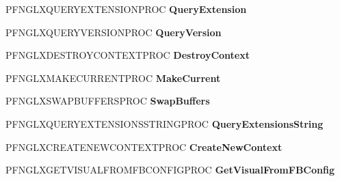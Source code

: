 \begin{DoxyCompactItemize}
\item 
\hypertarget{struct__GLFWlibraryGLX_a85b0d38829089464bb527e1160ea3d84}{}P\+F\+N\+G\+L\+X\+Q\+U\+E\+R\+Y\+E\+X\+T\+E\+N\+S\+I\+O\+N\+P\+R\+O\+C {\bfseries Query\+Extension}\label{struct__GLFWlibraryGLX_a85b0d38829089464bb527e1160ea3d84}

\item 
\hypertarget{struct__GLFWlibraryGLX_a7f19c51eb8a2b76be2b85d5ac6821d07}{}P\+F\+N\+G\+L\+X\+Q\+U\+E\+R\+Y\+V\+E\+R\+S\+I\+O\+N\+P\+R\+O\+C {\bfseries Query\+Version}\label{struct__GLFWlibraryGLX_a7f19c51eb8a2b76be2b85d5ac6821d07}

\item 
\hypertarget{struct__GLFWlibraryGLX_a84bc979545f50da00df2ca6c8c279c48}{}P\+F\+N\+G\+L\+X\+D\+E\+S\+T\+R\+O\+Y\+C\+O\+N\+T\+E\+X\+T\+P\+R\+O\+C {\bfseries Destroy\+Context}\label{struct__GLFWlibraryGLX_a84bc979545f50da00df2ca6c8c279c48}

\item 
\hypertarget{struct__GLFWlibraryGLX_a99f3ec71060b66bf6e7324697c15e32d}{}P\+F\+N\+G\+L\+X\+M\+A\+K\+E\+C\+U\+R\+R\+E\+N\+T\+P\+R\+O\+C {\bfseries Make\+Current}\label{struct__GLFWlibraryGLX_a99f3ec71060b66bf6e7324697c15e32d}

\item 
\hypertarget{struct__GLFWlibraryGLX_afd71b5d28763e2d279ad55bcd016ab87}{}P\+F\+N\+G\+L\+X\+S\+W\+A\+P\+B\+U\+F\+F\+E\+R\+S\+P\+R\+O\+C {\bfseries Swap\+Buffers}\label{struct__GLFWlibraryGLX_afd71b5d28763e2d279ad55bcd016ab87}

\item 
\hypertarget{struct__GLFWlibraryGLX_a0dd7cdefdb45bdd9e9b2334a2b4dce49}{}P\+F\+N\+G\+L\+X\+Q\+U\+E\+R\+Y\+E\+X\+T\+E\+N\+S\+I\+O\+N\+S\+S\+T\+R\+I\+N\+G\+P\+R\+O\+C {\bfseries Query\+Extensions\+String}\label{struct__GLFWlibraryGLX_a0dd7cdefdb45bdd9e9b2334a2b4dce49}

\item 
\hypertarget{struct__GLFWlibraryGLX_ad449f10460f7eb0b147d7982e0ef84ee}{}P\+F\+N\+G\+L\+X\+C\+R\+E\+A\+T\+E\+N\+E\+W\+C\+O\+N\+T\+E\+X\+T\+P\+R\+O\+C {\bfseries Create\+New\+Context}\label{struct__GLFWlibraryGLX_ad449f10460f7eb0b147d7982e0ef84ee}

\item 
\hypertarget{struct__GLFWlibraryGLX_a35d9a65ae03199683acfd16a8a8f2ab8}{}P\+F\+N\+G\+L\+X\+G\+E\+T\+V\+I\+S\+U\+A\+L\+F\+R\+O\+M\+F\+B\+C\+O\+N\+F\+I\+G\+P\+R\+O\+C {\bfseries Get\+Visual\+From\+F\+B\+Config}\label{struct__GLFWlibraryGLX_a35d9a65ae03199683acfd16a8a8f2ab8}


\end{DoxyCompactItemize}
